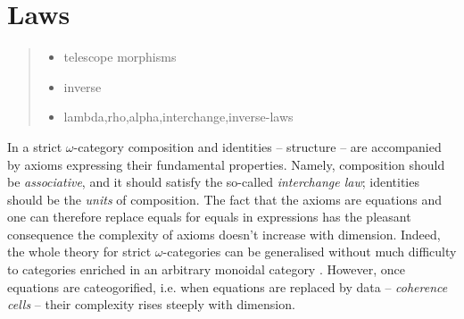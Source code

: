 
\section{Laws}
\label{sec:laws}

\begin{quote}
  \begin{itemize}
  \item telescope morphisms

  \item inverse

  \item lambda,rho,alpha,interchange,inverse-laws

  \end{itemize}
\end{quote}

%
In a strict $\omega$-category composition and
identities -- structure -- are accompanied by axioms expressing their fundamental
properties. Namely, composition should be \emph{associative}, and it
should satisfy the so-called \emph{interchange law}; identities should
be the \emph{units} of composition. The fact that the axioms are
equations and one can therefore replace equals for equals in
expressions has the pleasant consequence the
complexity of axioms doesn't increase with dimension. Indeed, the whole theory
for strict $\omega$-categories can be generalised without much difficulty
to categories enriched in an arbitrary monoidal
category \cite{kelly:1982}. However, once equations are cateogorified,
i.e. when equations are replaced by data -- \emph{coherence cells} -- their
complexity rises steeply with dimension. 

